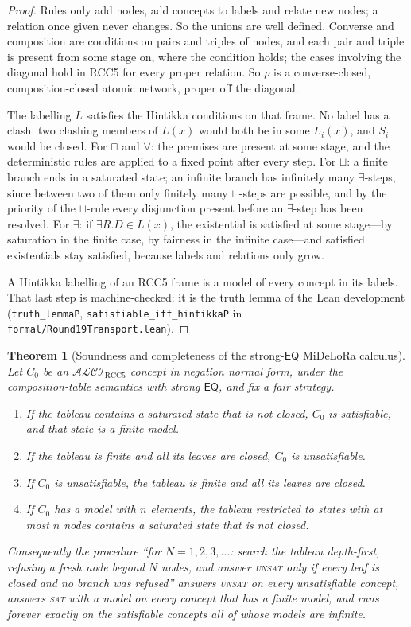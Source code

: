 \documentclass[11pt]{article}
\newcommand{\ALCIRCC}[1]{\mathcal{ALCI}_{\mathrm{RCC#1}}}
\newcommand{\EQ}{\mathsf{EQ}}
\newcommand{\code}[1]{\texttt{#1}}
\theoremstyle{plain}
\newtheorem{theorem}{Theorem}
\theoremstyle{definition}
\begin{document}
\begin{proof}
Rules only add nodes, add concepts to labels and relate new nodes; a relation
once given never changes. So the unions are well defined. Converse and
composition are conditions on pairs and triples of nodes, and each pair and
triple is present from some stage on, where the condition holds; the cases
involving the diagonal hold in RCC5 for every proper relation. So $\rho$ is a
converse-closed, composition-closed atomic network, proper off the diagonal.

The labelling $L$ satisfies the Hintikka conditions on that frame. No label
has a clash: two clashing members of $L(x)$ would both be in some $L_i(x)$,
and $S_i$ would be closed. For $\sqcap$ and $\forall$: the premises are present
at some stage, and the deterministic rules are applied to a fixed point after
every step. For $\sqcup$: a finite branch ends in a saturated state; an
infinite branch has infinitely many $\exists$-steps, since between two of them
only finitely many $\sqcup$-steps are possible, and by the priority of the
$\sqcup$-rule every disjunction present before an $\exists$-step has been
resolved. For $\exists$: if $\exists R.D\in L(x)$, the existential is satisfied
at some stage---by saturation in the finite case, by fairness in the infinite
case---and satisfied existentials stay satisfied, because labels and relations
only grow.

A Hintikka labelling of an RCC5 frame is a model of every concept in its
labels. That last step is machine-checked: it is the truth lemma of the Lean
development (\code{truth\_lemmaP}, \code{satisfiable\_iff\_hintikkaP} in
\texttt{formal/Round19Transport.lean}).
\end{proof}

\begin{theorem}[Soundness and completeness of the strong-$\EQ$ MiDeLoRa
calculus]\label{thm:midelora}
Let $C_0$ be an $\ALCIRCC5$ concept in negation normal form, under the
composition-table semantics with strong $\EQ$, and fix a fair strategy.
\begin{enumerate}\setlength\itemsep{0pt}
  \item If the tableau contains a saturated state that is not closed, $C_0$
    is satisfiable, and that state is a finite model.
  \item If the tableau is finite and all its leaves are closed, $C_0$ is
    unsatisfiable.
  \item If $C_0$ is unsatisfiable, the tableau is finite and all its leaves
    are closed.
  \item If $C_0$ has a model with $n$ elements, the tableau restricted to
    states with at most $n$ nodes contains a saturated state that is not
    closed.
\end{enumerate}
Consequently the procedure ``for $N=1,2,3,\dots$: search the tableau
depth-first, refusing a fresh node beyond $N$ nodes, and answer
\textsc{unsat} only if every leaf is closed and no branch was refused''
answers \textsc{unsat} on every unsatisfiable concept, answers \textsc{sat}
with a model on every concept that has a finite model, and runs forever
exactly on the satisfiable concepts all of whose models are infinite.
\end{theorem}
\end{document}
